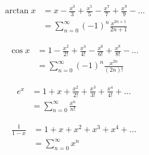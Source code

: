 






\[\begin{align} \arctan x &= x - \frac{x^3}{3} + \frac{x^5}{5} - \frac{x^7}{7} + \frac{x^9}{9} - \dotso \\\ &= \sum_{n=0}^\infty (-1)^n \frac{x^{2n + 1}}{2n + 1} \end{align}\]

\[\begin{align} \cos x &= 1 - \frac{x^2}{2!} + \frac{x^4}{4!} - \frac{x^6}{6!} + \frac{x^8}{8!} - \dotso \\\ &= \sum_{n=0}^\infty (-1)^n \frac{x^{2n}}{(2n)!} \end{align}\]

\[\begin{align} e^x &= 1 + x + \frac{x^2}{2!} + \frac{x^3}{3!} + \frac{x^4}{4!} + \dotso \\\ &= \sum_{n=0}^\infty \frac{x^n}{n!} \end{align}\]

\[\begin{align} \frac{1}{1-x} &= 1 + x + x^2 + x^3 + x^4 + \dotso \\\ &= \sum_{n=0}^\infty x^n \end{align}\]


